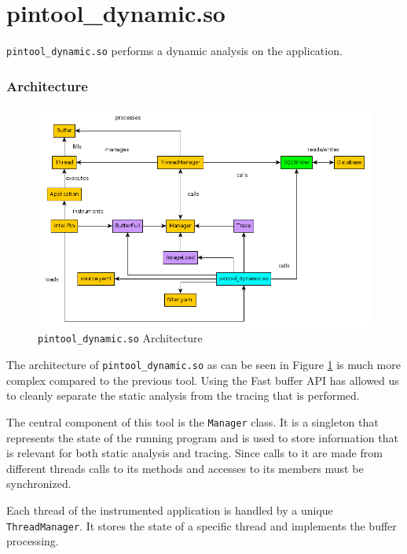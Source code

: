 \section{pintool\_dynamic.so}
\label{cap3:pintooldynamic}

\texttt{pintool\_dynamic.so} performs a dynamic analysis on the application.

\subsubsection{Architecture}

\begin{figure}
	\centering
	\includegraphics[width=1\textwidth]{dynamic-arch}
	\caption{\texttt{pintool\_dynamic.so} Architecture}
	\label{cap3:dynamic-arch}
\end{figure}

The architecture of \texttt{pintool\_dynamic.so} as can be seen in Figure \ref{cap3:dynamic-arch} is much more complex compared to the previous tool. Using the Fast buffer API has allowed us to cleanly separate the static analysis from the tracing that is performed.

The central component of this tool is the \texttt{Manager} class. It is a singleton that represents the state of the running program and is used to store information that is relevant for both static analysis and tracing. Since calls to it are made from different threads calls to its methods and accesses to its members must be synchronized.

Each thread of the instrumented application is handled by a unique \texttt{ThreadManager}. It stores the state of a specific thread and implements the buffer processing.

